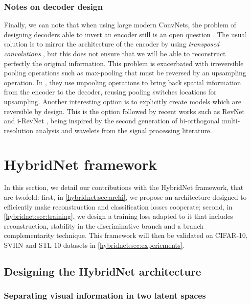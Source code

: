 \subsubsection*{Notes on decoder design}

Finally, we can note that when using large modern \acp{ConvNet}, the problem of designing decoders able to invert an encoder still is an open question \citep{Wojna2017}. The usual solution is to mirror the architecture of the encoder by using \textit{transposed convolutions} \citep{dumoulin2016guide}, but this does not ensure that we will be able to reconstruct perfectly the original information.
This problem is exacerbated with irreversible pooling operations such as max-pooling that must be reversed by an upsampling operation. In \citet{Zhao2016a,Zhang2016a}, they use unpooling operations to bring back spatial information from the encoder to the decoder, reusing pooling switches locations for upsampling.
Another interesting option is to explicitly create models which are reversible by design. This is the option followed by recent works such as RevNet \citep{NIPS2017_6816} and i-RevNet \citep{jacobsen:hal-01712808}, being inspired by the second generation of bi-orthogonal multi-resolution analysis and wavelets \citep{swe:spie95} from the signal processing literature.

\section{HybridNet framework}
\label{hybridnet:sec:model}

In this section, we detail our contributions with the HybridNet framework, that are twofold: first, in \autoref{hybridnet:sec:archi}, we propose an architecture designed to efficiently make reconstruction and classification losses cooperate; second, in \autoref{hybridnet:sec:training}, we design a training loss adapted to it that includes reconstruction, stability in the discriminative branch and a branch complementarity technique. This framework will then be validated on CIFAR-10, SVHN and STL-10 datasets in \autoref{hybridnet:sec:experiements}.

\subsection{Designing the HybridNet architecture}
\label{hybridnet:sec:archi}

\subsubsection{Separating visual information in two latent spaces}

